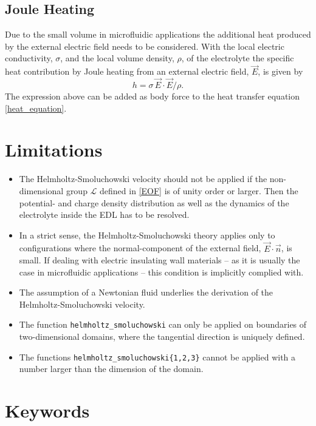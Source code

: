 \begin{versiona}
\subsection{Joule Heating}
Due to the small volume in microfluidic applications the additional heat produced by the external electric field needs to be considered. With the local electric conductivity, $\sigma$, and the local volume density, $\rho$, of the electrolyte the specific heat contribution by Joule heating from an external electric field, $\vec{E}$, is given by
\begin{equation}
\label{ek:joule-heating}
h = \sigma\,\vec{E}\cdot\vec{E}/\rho.
\end{equation}
The expression above can be added as body force to the heat transfer equation \eqref{heat_equation}.

\section{Limitations}
\begin{itemize}
\item The Helmholtz-Smoluchowski velocity should not be applied if the non-di\-men\-sion\-al group $\mathcal{L}$ defined in \ref{EOF} is of unity order or larger. Then the potential- and charge density distribution as well as the dynamics of the electrolyte inside the EDL has to be resolved. 
\item In a strict sense, the Helmholtz-Smoluchowski theory applies only to configurations where the normal-component of the external field, $\vec{E}\cdot\vec{n}$, is small. If dealing with electric insulating wall materials -- as it is usually the case in microfluidic applications -- this condition is implicitly complied with. 
\item The assumption of a Newtonian fluid underlies the derivation of the Helmholtz-Smoluchowski velocity.
\item The function \texttt{helmholtz\_smoluchowski} can only be applied on  boundaries of two-dimensional domains, where the tangential direction is uniquely defined.
\item The functions \texttt{helmholtz\_smoluchowski\{1,2,3\}} cannot be applied with a number larger than the dimension of the domain.
\end{itemize}


\section{Keywords}
\end{versiona}

